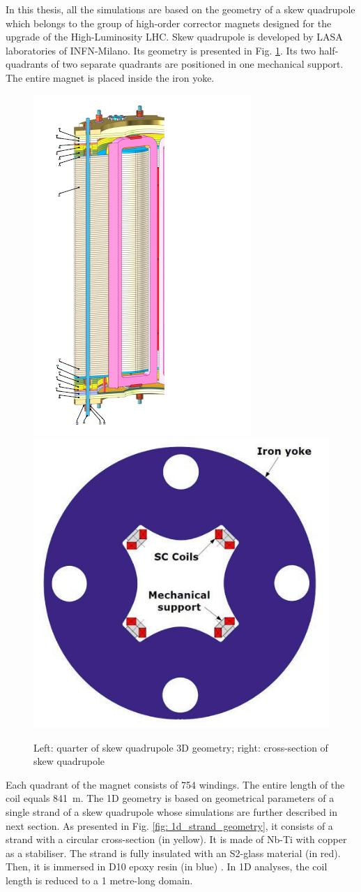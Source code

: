 
In this thesis, all the simulations are based on the geometry of a skew quadrupole which belongs to the group of high-order corrector magnets designed for the upgrade of the High-Luminosity LHC. Skew quadrupole is developed by LASA laboratories of INFN-Milano. Its geometry is presented in Fig. \ref{fig:Skew_quad_geometry}. Its two half-quadrants of two separate quadrants are positioned in one mechanical support. The entire magnet is placed inside the iron yoke. 

\begin{figure}[h!]
    \centering
    \includegraphics[width=0.225\linewidth]{sections/1D_quench_modelling/figures/geometry/SkewQuad3D.png}
    \includegraphics[width=0.30\linewidth]{sections/1D_quench_modelling/figures/geometry/Quadrupole_Cross_Section.png}
    \caption{Left: quarter of skew quadrupole 3D geometry; right: cross-section of skew quadrupole \cite{hl_lhc_tech_design_report_v01}}
    \label{fig:Skew_quad_geometry}
\end{figure}

Each quadrant of the magnet consists of 754 windings. The entire length of the coil equals 841~m. The 1D geometry is based on geometrical parameters of a single strand of a skew quadrupole whose simulations are further described in next section. As presented in Fig. \ref{fig: 1d_strand_geometry}, it consists of a strand with a circular cross-section (in yellow). It is made of Nb-Ti with copper as a stabiliser. The strand is fully insulated with an S2-glass material (in red). Then, it is immersed in D10 epoxy resin (in blue) \cite{hl_lhc_tech_design_report_v01}. In 1D analyses, the coil length is reduced to a 1 metre-long domain.

